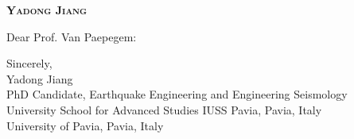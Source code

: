 \documentclass{article}
\begin{document}
\begin{center}

    \Large\selectfont
    \textbf{\textsc{Yadong Jiang}}\\
    
    \normalsize\selectfont
    
    
    
\end{center}
\par


\normalsize\selectfont


\par
\vspace{15pt}

\large\selectfont

Dear Prof. Van Paepegem:
\par

\par
Sincerely,\\
Yadong Jiang\\
PhD Candidate, Earthquake Engineering and Engineering Seismology\\
University School for Advanced Studies IUSS Pavia, Pavia, Italy\\
University of Pavia, Pavia, Italy
\end{document}
